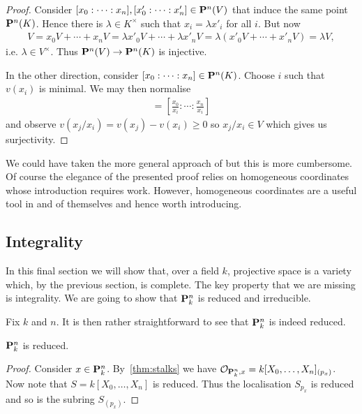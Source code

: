 \documentclass{article}
\begin{document}
\begin{theorem}
\begin{proof}
    Consider
    $[x_0:\cdots:x_n],[x'_0:\cdots:x'_n]\in\mathbf{P}^{n}_{}(V)$
    that induce the same point $\mathbf{P}^{n}_{}(K)$. Hence
    there is $\lambda\in K^\times$ such that $x_i = \lambda x'_i$
    for all $i$. But now
    \begin{align*}
      V = x_0V + \cdots + x_nV = \lambda x'_0 V + \cdots + \lambda x'_n V = \lambda (x'_0 V + \cdots + x'_n V) = \lambda V,
    \end{align*}
    i.e. $\lambda \in V^\times$. Thus
    $\mathbf{P}^{n}_{}(V)\to\mathbf{P}^{n}_{}(K)$ is injective.

    In the other direction, consider
    $[x_0:\cdots:x_n]\in \mathbf{P}^{n}_{}(K)$. Choose $i$ such
    that $v(x_i)$ is minimal. We may then normalise
    \begin{align*}
      [x_0:\cdots:x_n] = \left[{\frac{x_0}{x_i}: \cdots : \frac{x_n}{x_i}}\right]
    \end{align*}
    and observe $v(x_j/x_i) = v(x_j)-v(x_i) \geq 0$ so
    $x_j/x_i\in V$ which gives us surjectivity.
  \end{proof}
\end{theorem}

We could have taken the more general approach of
\cite[\href{https://stacks.math.columbia.edu/tag/01MF}{Tag 01MF}]{stacks-project} but this is more cumbersome. Of course the elegance
of the presented proof relies on homogeneous coordinates whose
introduction requires work. However, homogeneous coordinates are a
useful tool in and of themselves and hence worth introducing.

\subsection{Integrality}

In this final section we will show that, over a field $k$,
projective space is a variety which, by the previous section,
is complete. The key property that we are missing is integrality.
We are going to show that $\mathbf{P}^{n}_{k}$ is reduced and irreducible.

Fix $k$ and $n$.
It is then rather straightforward to see that $\mathbf{P}^{n}_{k}$
is indeed reduced.
\begin{lemma}\label{thm:reduced}
  $\mathbf{P}^{n}_{k}$ is reduced.
  \begin{proof}
    Consider $x\in \mathbf{P}^{n}_{k}$. By~\ref{thm:stalks} we have
    $\mathcal O_{\mathbf{P}^{n}_{k},x} = k[X_0,\ldots,X_n]_{(p_x)}$.
    Now note
    that $S=k[X_0,\ldots,X_n]$ is reduced. Thus the localisation
    $S_{p_x}$ is reduced and so is the subring $S_{(p_x)}$.
  \end{proof}
\end{lemma}
\end{document}
